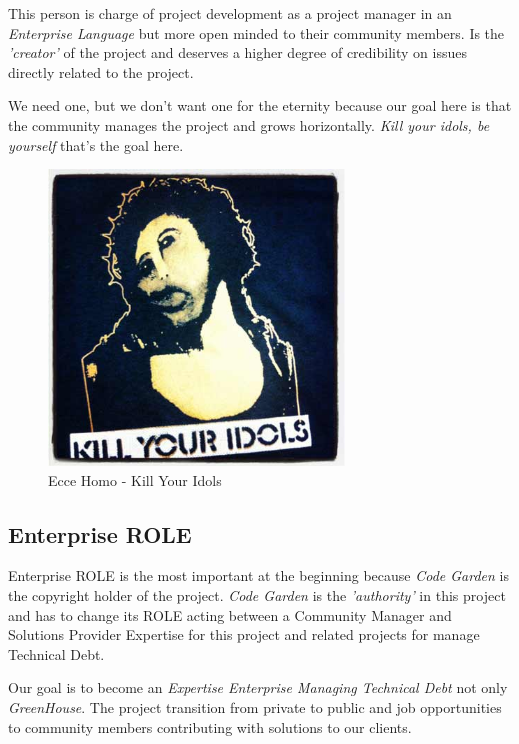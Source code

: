 \documentclass[11pt]{scrartcl}
\begin{document}
\par This person is charge of project development as a project manager in an \emph{Enterprise Language} but more open minded to their community members. Is the \emph{'creator'} of the project and deserves a higher degree of credibility on issues directly related to the project.

\par We need one, but we don't want one for the eternity because our goal here is that the community manages the project and grows horizontally. \emph{Kill your idols, be yourself} that's the goal here.

\begin{figure}[H]
\centering
\includegraphics[width=0.7\textwidth]{killyouridols.jpg}
\caption{Ecce Homo - Kill Your Idols}
\label{kill-your-idols}
\end{figure}


\subsection{Enterprise ROLE}
\label{sub:enterprise-role}

\par Enterprise ROLE is the most important at the beginning because \emph{Code Garden} is the copyright holder of the project. \emph{Code Garden} is the \emph{'authority'} in this project and has to change its ROLE acting between a Community Manager and Solutions Provider Expertise for this project and related projects for manage Technical Debt.

\par Our goal is to become an \emph{Expertise Enterprise Managing Technical Debt} not only \emph{GreenHouse}. The project transition from private to public and job opportunities to community members contributing with solutions to our clients.
\end{document}
